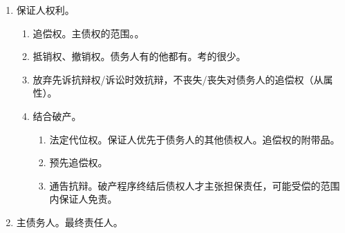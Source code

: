 \begin{enumerate}
\begin{enumerate}
          \item {}。保证人承担责任的期间。
                \begin{enumerate}
                  \item 不变期间 \yjt 因为无限责任。。
                        \begin{enumerate}
                          \item 法院应依职权主动调查适用。
                          \item {}。
                        \end{enumerate}
                  \item {}。。
                  \item 多段保证，分段独立计算。。
                  \item {}。
                  \item 一旦债权人起诉，。
                \end{enumerate}
        \end{enumerate}
        
  \item 保证人权利。
        \begin{enumerate}
          \item 追偿权。\xydy 主债权的范围。。
          \item 抵销权、撤销权。债务人有的他都有。考的很少。
          \item 放弃先诉抗辩权/诉讼时效抗辩，不丧失/丧失对债务人的追偿权（从属性）。
          \item 结合破产。
                \begin{enumerate}
                  \item 法定代位权。保证人优先于债务人的其他债权人。追偿权的附带品。
                  \item 预先追偿权。
                  \item 通告抗辩。破产程序终结后债权人才主张担保责任，可能受偿的范围内保证人免责。
                \end{enumerate}
        \end{enumerate}
  \item 主债务人。最终责任人。

\end{enumerate}
